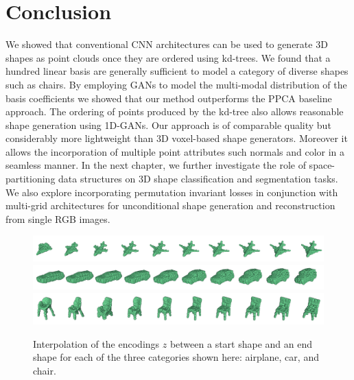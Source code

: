 \section{Conclusion} \label{sec:conclusion}
We showed that conventional CNN architectures can be used to generate 3D shapes as point clouds once they are ordered using kd-trees.
We found that a hundred linear basis are generally sufficient to model a category of diverse shapes such as chairs.
By employing GANs to model the multi-modal distribution of the basis coefficients we showed that our method outperforms the PPCA baseline approach.
The ordering of points produced by the kd-tree also allows reasonable shape generation using 1D-GANs.
Our approach is of comparable quality but considerably more lightweight than 3D voxel-based shape generators.
Moreover it allows the incorporation of multiple point attributes such normals and color in a seamless manner.
In the next chapter, we further investigate the role of space-partitioning data structures on 3D shape classification and segmentation tasks.
We also explore incorporating permutation invariant losses in conjunction with multi-grid architectures
for unconditional shape generation and reconstruction from single RGB images.
\begin{figure}[h]
\includegraphics[width=1.0\linewidth]{PCAGAN/images/airplane_interpolation2.png}
\includegraphics[width=1.0\linewidth]{PCAGAN/images/car_interpolation2.png}
\includegraphics[width=1.0\linewidth]{PCAGAN/images/chair_interpolation2.png}
\vspace{-16pt}
\caption{\small \label{pca:interpolation} Interpolation of the encodings $z$ between a start shape and an end shape for each of the three categories shown here: airplane, car, and chair.}
\vspace{-12pt}
\end{figure}
